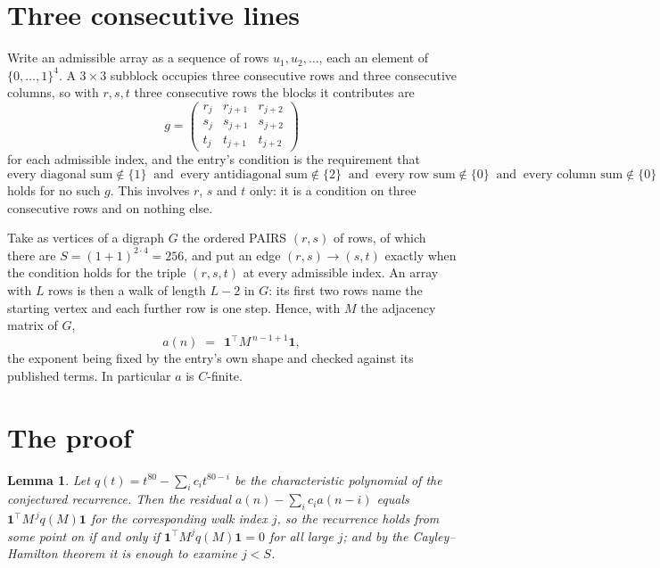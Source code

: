 \documentclass[11pt,a4paper]{article}
\theoremstyle{plain}
\newtheorem{lemma}[theorem]{Lemma}
\theoremstyle{definition}
\begin{document}
\section{Three consecutive lines}

Write an admissible array as a sequence of rows $u_1,u_2,\dots$, each an element of
$\{0,\dots,1\}^{4}$. A $3\times3$ subblock occupies three consecutive rows and
three consecutive columns, so with $r,s,t$ three consecutive rows the blocks it
contributes are
\[
g=\begin{pmatrix}r_j&r_{j+1}&r_{j+2}\\ s_j&s_{j+1}&s_{j+2}\\ t_j&t_{j+1}&t_{j+2}\end{pmatrix}
\]
for each admissible index, and the entry's condition is the requirement that
\[
\text{every diagonal sum} \notin \{1\}\ \text{ and }\ \text{every antidiagonal sum} \notin \{2\}\ \text{ and }\ \text{every row sum} \notin \{0\}\ \text{ and }\ \text{every column sum} \notin \{0\}
\]
holds for no such $g$. This involves $r$, $s$ and $t$ only: it is a condition on
three consecutive rows and on nothing else.

Take as vertices of a digraph $G$ the ordered PAIRS $(r,s)$ of rows, of which there are
$S=(1+1)^{2\cdot4}=256$, and put an edge $(r,s)\to(s,t)$ exactly when the condition
holds for the triple $(r,s,t)$ at every admissible index. An array with $L$ rows is then a
walk of length $L-2$ in $G$: its first two rows name the starting vertex and each further
row is one step. Hence, with $M$ the adjacency matrix of $G$,
\[
a(n)\;=\;\,\mathbf{1}^{\!\top}M^{\,n-1+1}\mathbf{1},
\]
the exponent being fixed by the entry's own shape and checked against its published terms.
In particular $a$ is $C$-finite.

\section{The proof}

\begin{lemma}\label{lem:crit}
Let $q(t)=t^{80}-\sum_i c_it^{80-i}$ be the characteristic polynomial of the
conjectured recurrence. Then the residual $a(n)-\sum_ic_ia(n-i)$ equals
$\mathbf{1}^{\!\top}M^{\,j}q(M)\mathbf{1}$ for the corresponding walk index
$j$, so the recurrence holds from some point on if and only if
$\mathbf{1}^{\!\top}M^{j}q(M)\mathbf{1}=0$ for all large $j$; and by the
Cayley--Hamilton theorem it is enough to examine $j<S$.
\end{lemma}
\end{document}
